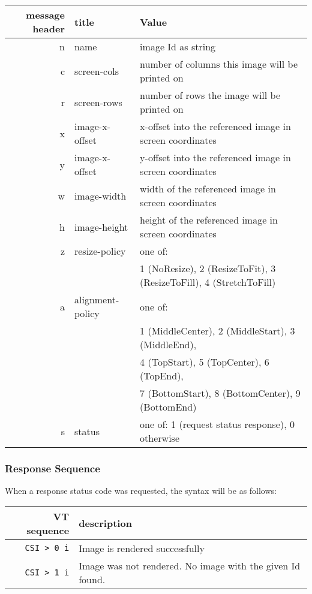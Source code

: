 \documentclass[a4paper]{article}
\newcommand{\code}[1]{\colorbox{light-gray}{\texttt{#1}}}
\begin{document}
\begin{tabular}{ |r|l|l| }
    \hline
    \textbf{message header}   & \textbf{title}   & \textbf{Value} \\
    \hline
    n & name            & image Id as string \\
    c & screen-cols     & number of columns this image will be printed on \\
    r & screen-rows     & number of rows the image will be printed on \\
    x & image-x-offset  & x-offset into the referenced image in screen coordinates \\
    y & image-x-offset  & y-offset into the referenced image in screen coordinates \\
    w & image-width     & width of the referenced image in screen coordinates \\
    h & image-height    & height of the referenced image in screen coordinates \\
    z & resize-policy   & one of: \\ %
      &                 & 1 (NoResize), 2 (ResizeToFit), 3 (ResizeToFill), 4 (StretchToFill) \\
    a & alignment-policy & one of: \\
      &                 & 1 (MiddleCenter), 2 (MiddleStart), 3 (MiddleEnd), \\
      &                 & 4 (TopStart), 5 (TopCenter), 6 (TopEnd), \\
      &                 & 7 (BottomStart), 8 (BottomCenter), 9 (BottomEnd) \\
    s & status          & one of: 1 (request status response), 0 otherwise \\
    \hline
\end{tabular}

\subsubsection*{Response Sequence}

When a response status code was requested, the syntax will be as follows:

\begin{tabular}{ |r|l| }
    \hline
    \textbf{VT sequence} & \textbf{description} \\
    \hline
    \code{CSI > 0 i} & Image is rendered successfully \\
    \code{CSI > 1 i} & Image was not rendered. No image with the given Id found. \\
    \hline
\end{tabular}
\end{document}
